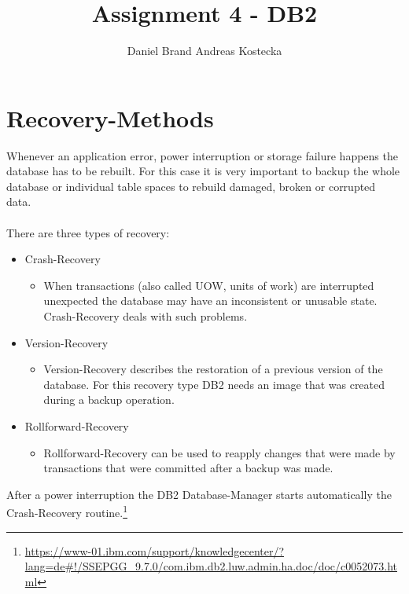 \documentclass{vldb}
\begin{document}

\title{Assignment 4 - DB2}



\author{
\alignauthor Daniel Brand
\alignauthor Andreas Kostecka
}

\maketitle

\section{Recovery-Methods}
Whenever an application error, power interruption or storage failure happens the database has to be rebuilt. For this case it is very important to backup the whole database or individual table spaces to rebuild damaged, broken or corrupted data. \\\\
There are three types of recovery:
\begin{itemize}
\item Crash-Recovery
\begin{itemize}
\item When transactions (also called UOW, units of work) are interrupted unexpected the database may have an inconsistent or unusable state. Crash-Recovery deals with such problems. 
\end{itemize}
\item Version-Recovery
\begin{itemize}
\item Version-Recovery describes the restoration of a previous version of the database. For this recovery type DB2 needs an image that was created during a backup operation.
\end{itemize}
\item Rollforward-Recovery
\begin{itemize}
\item Rollforward-Recovery can be used to reapply changes that were made by transactions that were committed after a backup was made.
\end{itemize}
\end{itemize}

After a power interruption the DB2 Database-Manager starts automatically the Crash-Recovery routine.\footnote{\url{https://www-01.ibm.com/support/knowledgecenter/?lang=de#!/SSEPGG_9.7.0/com.ibm.db2.luw.admin.ha.doc/doc/c0052073.html}}
\end{document}

